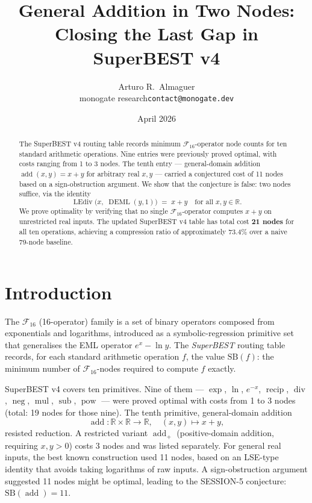 \documentclass[12pt,a4paper]{article}
\title{General Addition in Two Nodes:\\
       Closing the Last Gap in SuperBEST v4}
\author{Arturo R.\ Almaguer\\
  \small monogate research\quad\texttt{contact@monogate.dev}}
\date{April 2026}
\theoremstyle{definition}
\newcommand{\DEML}{\operatorname{DEML}}
\newcommand{\LEdiv}{\operatorname{LEdiv}}
\newcommand{\recip}{\operatorname{recip}}
\newcommand{\divop}{\operatorname{div}}
\newcommand{\mulop}{\operatorname{mul}}
\newcommand{\subop}{\operatorname{sub}}
\newcommand{\addop}{\operatorname{add}}
\newcommand{\negop}{\operatorname{neg}}
\newcommand{\powop}{\operatorname{pow}}
\newcommand{\SB}{\mathrm{SB}}
\newcommand{\F}{\mathcal{F}_{16}}
\newcommand{\R}{\mathbb{R}}
\begin{document}
\maketitle

\begin{abstract}
The SuperBEST v4 routing table records minimum $\mathcal{F}_{16}$-operator node
counts for ten standard arithmetic operations.
Nine entries were previously proved optimal, with costs ranging from 1 to 3 nodes.
The tenth entry --- general-domain addition $\addop(x,y) = x+y$ for arbitrary
real $x, y$ --- carried a conjectured cost of 11 nodes based on a sign-obstruction
argument.
We show that the conjecture is false: two nodes suffice, via the identity
\[
  \LEdiv\!\bigl(x,\;\DEML(y,1)\bigr) \;=\; x + y
  \quad\text{for all }x, y \in \R.
\]
We prove optimality by verifying that no single $\F$-operator computes $x+y$
on unrestricted real inputs.
The updated SuperBEST v4 table has total cost \textbf{21 nodes} for all ten
operations, achieving a compression ratio of approximately 73.4\% over a
naive 79-node baseline.
\end{abstract}

\section{Introduction}
\label{sec:intro}

The $\F$ (16-operator) family is a set of binary operators composed from
exponentials and logarithms, introduced as a symbolic-regression primitive set
that generalises the EML operator $e^x - \ln y$.
The \emph{SuperBEST} routing table records, for each standard arithmetic
operation $f$, the value $\SB(f)$: the minimum number of $\F$-nodes required
to compute $f$ exactly.

SuperBEST v4 covers ten primitives.
Nine of them --- $\exp$, $\ln$, $e^{-x}$, $\recip$, $\divop$, $\negop$,
$\mulop$, $\subop$, $\powop$ --- were proved optimal with costs from 1 to 3
nodes (total: 19 nodes for those nine).
The tenth primitive, general-domain addition
\[
  \addop \colon \R \times \R \to \R, \quad (x,y) \mapsto x+y,
\]
resisted reduction.
A restricted variant $\addop_{+}$ (positive-domain addition, requiring $x,y > 0$)
costs 3 nodes and was listed separately.
For general real inputs, the best known construction used 11 nodes,
based on an LSE-type identity that avoids taking logarithms of raw inputs.
A sign-obstruction argument suggested 11 nodes might be optimal, leading to
the SESSION-5 conjecture: $\SB(\addop) = 11$.
\end{document}
